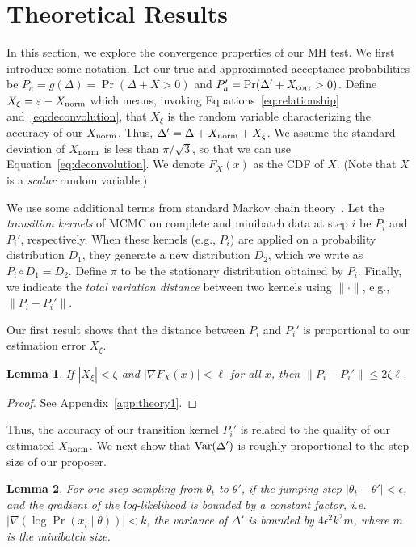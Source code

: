 \documentclass{article}
\newtheorem{lemma}{Lemma}
\begin{document}
\section{Theoretical Results}\label{sec:theory}

In this section, we explore the convergence properties of our MH test. We first introduce some
notation. Let our true and approximated acceptance probabilities be $P_a = g(\Delta) = \Pr(\Delta +
X > 0)$ and $P_a' = \Pr(\Delta' + X_{\rm corr} > 0)$.  Define $X_{\xi} = \varepsilon - X_{\rm norm}$
which means, invoking Equations~\ref{eq:relationship} and~\ref{eq:deconvolution}, that $X_\xi$ is
the random variable characterizing the accuracy of our $X_{\rm norm}$.  Thus, $\Delta' = \Delta +
X_{\rm norm} + X_\xi$. We assume the standard deviation of $X_{\rm norm}$ is less than
$\pi/\sqrt{3}$, so that we can use Equation~\ref{eq:deconvolution}. We denote $F_X(x)$ as the CDF of
$X$. (Note that $X$ is a \emph{scalar} random variable.)

We use some additional terms from standard Markov chain theory~\cite{Meyn2009}. Let the
\emph{transition kernels} of MCMC on complete and minibatch data at step $i$ be $P_i$ and $P_i'$,
respectively. When these kernels (e.g., $P_i$) are applied on a probability distribution $D_1$, they
generate a new distribution $D_2$, which we write as $P_i \circ D_1 = D_2$. Define $\pi$ to be the
stationary distribution obtained by $P_i$.  Finally, we indicate the \emph{total variation distance}
between two kernels using $\| \cdot \|$, e.g., $\|P_i-P_i'\|$.

Our first result shows that the distance between $P_i$ and $P_i'$ is proportional to our estimation
error $X_{\xi}$.

\begin{lemma}\label{lem:theory1}
If $|X_\xi| < \zeta$ and $|\nabla F_X(x)| < \ell$ for all $x$, then $\|P_i-P_i'\| \le 2\zeta \ell$.
\end{lemma}

\begin{proof}
See Appendix~\ref{app:theory1}.
\end{proof}

Thus, the accuracy of our transition kernel $P_i'$ is related to the quality of our estimated
$X_{\rm norm}$. We next show that ${\rm Var}(\Delta')$ is roughly proportional to the step size of
our proposer.

\begin{lemma}\label{lem:theory2}
For one step sampling from $\theta_t$ to $\theta'$, if the jumping step $|\theta_t - \theta'| <
\epsilon$, and the gradient of the log-likelihood is bounded by a constant factor, i.e. $|\nabla
(\log \Pr(x_i\mid \theta))| < k$, the variance of $\Delta'$ is bounded by $4\epsilon^2 k^2 m$, where
$m$ is the minibatch size.
\end{lemma}
\end{document}
